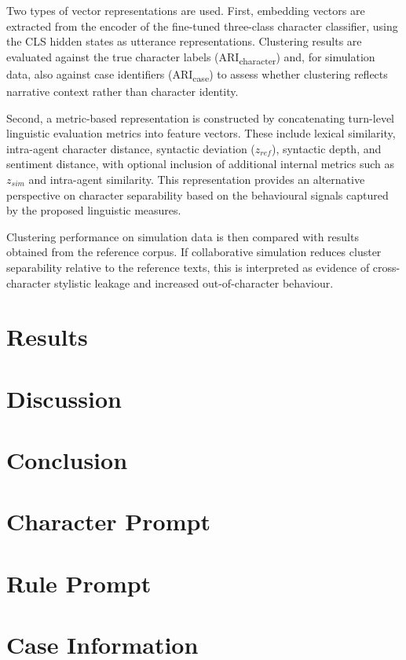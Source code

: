 \documentclass{article}
\begin{document}
Two types of vector representations are used. First, embedding vectors are extracted from the encoder of the fine-tuned three-class character classifier, using the CLS hidden states as utterance representations. Clustering results are evaluated against the true character labels (ARI\textsubscript{character}) and, for simulation data, also against case identifiers (ARI\textsubscript{case}) to assess whether clustering reflects narrative context rather than character identity.

Second, a metric-based representation is constructed by concatenating turn-level linguistic evaluation metrics into feature vectors. These include lexical similarity, intra-agent character distance, syntactic deviation ($z_{ref}$), syntactic depth, and sentiment distance, with optional inclusion of additional internal metrics such as $z_{sim}$ and intra-agent similarity. This representation provides an alternative perspective on character separability based on the behavioural signals captured by the proposed linguistic measures.

Clustering performance on simulation data is then compared with results obtained from the reference corpus. If collaborative simulation reduces cluster separability relative to the reference texts, this is interpreted as evidence of cross-character stylistic leakage and increased out-of-character behaviour.

\section{Results}

\section{Discussion}

\section{Conclusion}









\begin{appendices}
\section{Character Prompt}  

\section{Rule Prompt}

\section{Case Information}


\end{appendices}
\end{document}
